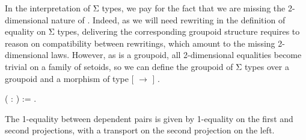 \label{sec:sigma} In the interpretation of Σ types, we pay for the
fact that we are missing the 2-dimensional nature of . Indeed, as
we will need rewriting in the definition of equality on Σ types,
delivering the corresponding groupoid structure requires to reason on
compatibility between rewritings, which amount to the missing
2-dimensional laws. However, as  is a groupoid, all 2-dimensional
equalities become trivial on a family of setoids, so we can define the
groupoid of Σ types over a groupoid  and a morphism of type  [ $\longrightarrow$ ] .\begin{coqdoccode}
\coqdocemptyline
\coqdocemptyline
\coqdocnoindent
{}   ( : \coqref{Groupoid.groupoid.::'[' x ']'}{\coqdocnotation{[}}  \coqref{Groupoid.groupoid.::'[' x ']'}{\coqdocnotation{]}}) := \coqdocnotation{\{} \coqdocnotation{:} \coqref{Groupoid.groupoid.::'[' x ']'}{\coqdocnotation{[}}\coqref{Groupoid.groupoid.::'[' x ']'}{\coqdocnotation{]}} \coqdocnotation{\&} \coqref{Groupoid.groupoid.::'[' x ']'}{\coqdocnotation{[}}  \coqref{Groupoid.groupoid.::'[' x ']'}{\coqdocnotation{]}}\coqdocnotation{\}}.\coqdoceol
\coqdocemptyline
\end{coqdoccode}
\noindent
  The 1-equality between dependent pairs is given by 1-equality on the
  first and second projections, with a transport on the second
  projection on the left.
